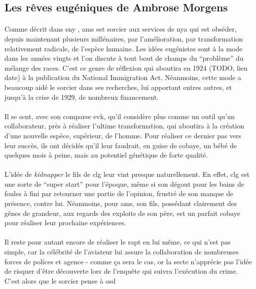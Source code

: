 \subsection{Les rêves eugéniques de Ambrose Morgens}

\paragraph{} Comme décrit dans \gls{sny} , \gls{ams} est sorcier aux services de \gls{nya} qui est obséder, depuis maintenant plusieurs
millénaires, par l'amélioration, par transformation relativement radicale, de l'espèce humaine. Les idées eugénistes sont à la mode dans 
les années vingts et l'on discute à tout bout de champs du ``problème'' du mélange des races. C'est ce genre de réflexion qui aboutira en
1924 (TODO, lien date) à la publication du National Immigration Act. Néanmoins, cette mode a beaucoup aidé le sorcier dans ses recherches,
lui apportant entres autres, et jusqu'à la crise de 1929, de nombreux financement.
\paragraph{} Il se sent, avec son comparse \gls{evk}, qu'il considère plus comme un outil qu'un collaborateur, près à réaliser l'ultime transformation, qui aboutira à la création d'une nouvelle espèce, supérieur, de l'homme. Pour réaliser ce dernier pas vers leur succès, ils ont décidés qu'il leur faudrait, en guise de cobaye, un bébé de quelques mois à peine, mais au potentiel génétique de forte qualité. 
\paragraph{} L'idée de \emph{kidnapper} le fils de \gls{clg} leur vint presque naturellement. En effet, \gls{clg} est une sorte de ``super start''
pour l'époque, même si son dégout pour les bains de foules à fini par retourner une partie de l'opinion, frustré de son manque de présence, contre
lui. Néanmoins, pour \gls{ams}, son fils, possédant clairement des gênes de grandeur, aux regards des exploits de son père, est un parfait cobaye
pour réaliser leur prochaine expériences.
\paragraph{} Il reste pour autant encore de réaliser le rapt en lui même, ce qui n'est pas simple, car la célébrité de l'aviateur lui assure la
collaboration de nombreuses forces de polices et agence - comme ça sera le cas, or la secte n'apprécie pas l'idée de risquer d'être découverte
lors de l'enquête qui suivra l'exécution du crime. C'est alors que le sorcier pense à \gls{osd}

